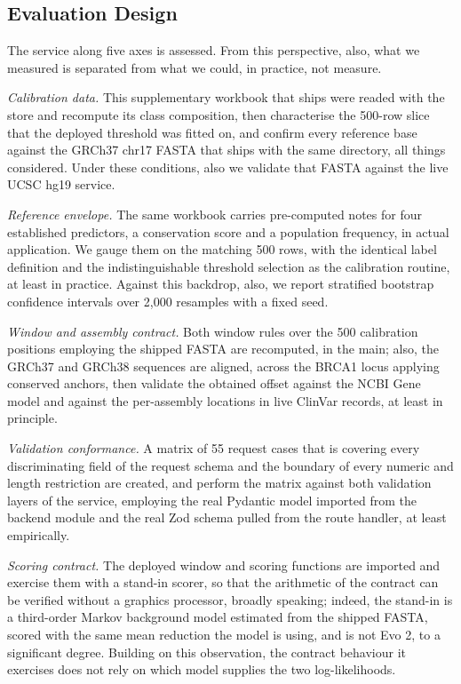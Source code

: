 \documentclass[10pt,journal]{IEEEtran}
\begin{document}
\subsection{Evaluation Design}
The service along five axes is assessed. From this perspective, also, what we measured is separated from what we could, in practice, not measure.

\emph{Calibration data.} This supplementary workbook that ships were readed with the store and recompute its class composition, then characterise the 500-row slice that the deployed threshold was fitted on, and confirm every reference base against the GRCh37 chr17 FASTA that ships with the same directory, all things considered. Under these conditions, also we validate that FASTA against the live UCSC hg19 service.

\emph{Reference envelope.} The same workbook carries pre-computed notes for four established predictors, a conservation score and a population frequency, in actual application. We gauge them on the matching 500 rows, with the identical label definition and the indistinguishable threshold selection as the calibration routine, at least in practice. Against this backdrop, also, we report stratified bootstrap confidence intervals over 2{,}000 resamples with a fixed seed.

\emph{Window and assembly contract.} Both window rules over the 500 calibration positions employing the shipped FASTA are recomputed, in the main; also, the GRCh37 and GRCh38 sequences are aligned, across the BRCA1 locus applying conserved anchors, then validate the obtained offset against the NCBI Gene model and against the per-assembly locations in live ClinVar records, at least in principle.

\emph{Validation conformance.} A matrix of 55 request cases that is covering every discriminating field of the request schema and the boundary of every numeric and length restriction are created, and perform the matrix against both validation layers of the service, employing the real Pydantic model imported from the backend module and the real Zod schema pulled from the route handler, at least empirically.

\emph{Scoring contract.} The deployed window and scoring functions are imported and exercise them with a stand-in scorer, so that the arithmetic of the contract can be verified without a graphics processor, broadly speaking; indeed, the stand-in is a third-order Markov background model estimated from the shipped FASTA, scored with the same mean reduction the model is using, and is not Evo 2, to a significant degree. Building on this observation, the contract behaviour it exercises does not rely on which model supplies the two log-likelihoods.
\end{document}
